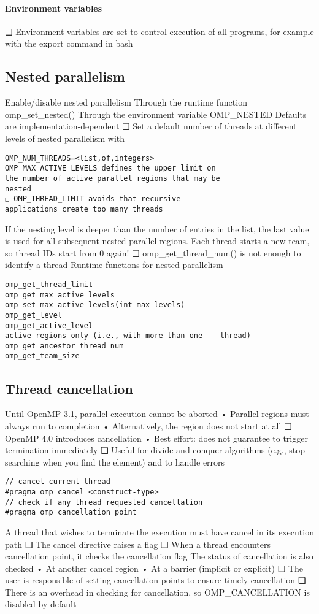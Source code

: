 \paragraph*{Environment variables}
❑ Environment variables are set to control execution
of all programs, for example with the export
command in bash

\subsection{Nested parallelism}
Enable/disable nested parallelism
 Through the runtime function omp_set_nested()
 Through the environment variable OMP_NESTED
 Defaults are implementation-dependent
❑ Set a default number of threads at different levels
of nested parallelism with
\begin{lstlisting}[style=C]
OMP_NUM_THREADS=<list,of,integers>
OMP_MAX_ACTIVE_LEVELS defines the upper limit on
the number of active parallel regions that may be
nested
❑ OMP_THREAD_LIMIT avoids that recursive
applications create too many threads
\end{lstlisting}
 If the nesting level is deeper than the number of
entries in the list, the last value is used for all
subsequent nested parallel regions.
Each thread starts a new team, so thread IDs start
from 0 again!
❑ omp_get_thread_num() is not enough to identify a
thread
Runtime functions for nested parallelism
\begin{lstlisting}[style=C]
omp_get_thread_limit
omp_get_max_active_levels
omp_set_max_active_levels(int max_levels)
omp_get_level
omp_get_active_level
active regions only (i.e., with more than one    thread)
omp_get_ancestor_thread_num
omp_get_team_size
\end{lstlisting}





\subsection{Thread cancellation}
Until OpenMP 3.1, parallel execution cannot be
aborted
• Parallel regions must always run to completion
• Alternatively, the region does not start at all
❑ OpenMP 4.0 introduces cancellation
• Best effort: does not guarantee to trigger
termination immediately
❑ Useful for divide-and-conquer algorithms (e.g.,
stop searching when you find the element) and to
handle errors
\begin{lstlisting}[style=C]
// cancel current thread 
#pragma omp cancel <construct-type>
// check if any thread requested cancellation
#pragma omp cancellation point
\end{lstlisting}
A thread that wishes to terminate the execution
must have cancel in its execution path
❑ The cancel directive raises a flag
❑ When a thread encounters cancellation point,
it checks the cancellation flag
The status of cancellation is also checked
• At another cancel region
• At a barrier (implicit or explicit)
❑ The user is responsible of setting cancellation
points to ensure timely cancellation
❑ There is an overhead in checking for cancellation,
so OMP_CANCELLATION is disabled by default

